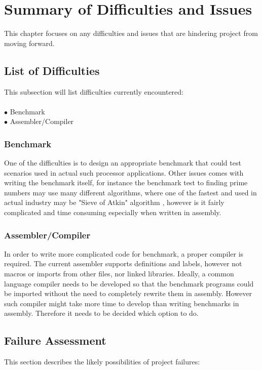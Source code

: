 \documentclass[a4paper,12pt]{article}
\begin{document}
\section{Summary of Difficulties and Issues}
\begin{multicols}{2}
This chapter focuses on any difficulties and issues that are hindering project from moving forward.

\subsection{List of Difficulties}

This subsection will list difficulties currently encountered:\\
\\
$\bullet$ Benchmark\\
$\bullet$ Assembler/Compiler

\subsubsection{Benchmark} \label{sec:benchmark_issues}
One of the difficulties is to design an appropriate benchmark that could test scenarios used in actual such processor applications. Other issues comes with writing the benchmark itself, for instance the benchmark test to finding prime numbers may use many different algorithms, where one of the fastest and used in actual industry may be "Sieve of Atkin" algorithm \autocite{morain_1989}, however is it fairly complicated and time consuming especially when written in assembly. 

\subsubsection{Assembler/Compiler}
In order to write more complicated code for benchmark, a proper compiler is required. The current assembler supports definitions and labels, however not macros or imports from other files, nor linked libraries. Ideally, a common language compiler needs to be developed so that the benchmark programs could be imported without the need to completely rewrite them in assembly. However such compiler might take more time to develop than writing benchmarks in assembly. Therefore it needs to be decided which option to do.

\subsection{Failure Assessment}
This section describes the likely possibilities of project failures:


\end{multicols}
\end{document}
